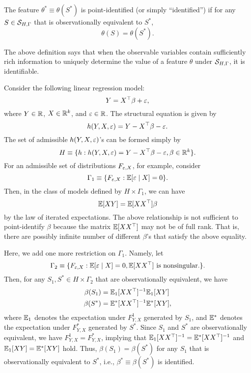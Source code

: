 \documentclass[11pt, A4paper, openany, uplatex]{book}
\begin{document}
\begin{definition} \label{def:identification}
	The feature $\theta^* \equiv \theta(S^*)$ is point-identified (or simply ``identified'') if for any $S \in \mathcal{S}_{H,\Gamma}$ that is observationally equivalent to $S^*$,
	\[
	\theta(S) = \theta(S^*).
	\]
\end{definition}
The above definition says that when the observable variables contain sufficiently rich information to uniquely determine the value of a feature $\theta$ under $\mathcal{S}_{H,\Gamma}$, it is identifiable.

\begin{example}\upshape
	Consider the following linear regression model:
	\[
		Y = X^\top \beta + \varepsilon,
	\]
	where $Y \in \mathbb{R}$, $X \in \mathbb{R}^k$, and $\varepsilon \in \mathbb{R}$.
	The structural equation is given by
	\[
	 	h(Y, X, \varepsilon) = Y - X^\top \beta - \varepsilon.
	\]
	The set of admissible $h(Y, X, \varepsilon)$'s can be formed simply by 
	\[
		H \equiv \{h : h(Y, X, \varepsilon) = Y -X^\top \beta-\varepsilon,  \beta \in \mathbb{R}^k\}.	
	\]
	For an admissible set of distributions $F_{\varepsilon,X}$, for example, consider 
	\[
		\Gamma_1 \equiv \{F_{\varepsilon,X} : \mathbb{E}[\varepsilon \mid X] = 0\}.
	\]
	Then, in the class of models defined by $H \times \Gamma_1$, we can have
	\[
	\mathbb{E} [XY ] = \mathbb{E}[XX^\top] \beta
	\]
	by the law of iterated expectations.
	The above relationship is not sufficient to point-identify $\beta$ because the matrix $\mathbb{E} [XX^\top]$ may not be of full rank.
	That is, there are possibly infinite number of different  $\beta$'s that satisfy the above equality.

	Here, we add one more restriction on $\Gamma_1$.
	Namely, let 
	\[
		\Gamma_2 \equiv \{F_{\varepsilon,X} : \mathbb{E}[\varepsilon \mid X] = 0, \mathbb{E}[XX^\top] \text{ is nonsingular.} \}.
	\]
	Then, for any $S_1, S^* \in H \times \Gamma_2$ that are observationally equivalent, we have
	\begin{align*}
	\beta(S_1) & = \mathbb{E}_1[XX^\top]^{-1} \mathbb{E}_1[XY ] \\
	\beta(S^*) & = \mathbb{E}^*[XX^\top]^{-1} \mathbb{E}^*[XY ],
	\end{align*}
	where $\mathbb{E}_1$ denotes the expectation under $F^1_{Y,X}$ generated by $S_1$, and $\mathbb{E}^*$ denotes the expectation under $F^*_{Y,X}$ generated by $S^*$.
	Since $S_1$ and $S^*$ are observationally equivalent, we have $F^1_{Y,X} = F^*_{Y,X}$, implying that $\mathbb{E}_1[XX^\top]^{-1} = \mathbb{E}^*[XX^\top]^{-1}$ and $\mathbb{E}_1[XY ] = \mathbb{E}^*[XY ]$ hold.
	Thus,  $\beta(S_1) =  \beta(S^*)$ for any $S_1$ that is observationally equivalent to $S^*$, i.e.,  $\beta^* \equiv \beta(S^*)$ is identified.
\end{example}
\end{document}

